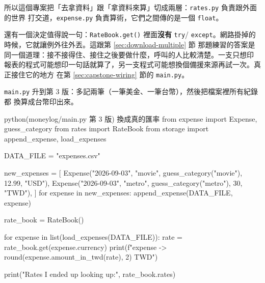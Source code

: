 所以這個專案把「去拿資料」跟「拿資料來算」切成兩層：\texttt{rates.py} 負責跟外面的世界
打交道，\texttt{expense.py} 負責算術，它們之間傳的是一個 \texttt{float}。


還有一個決定值得說一句：\texttt{RateBook.get()} 裡面\textbf{沒有} \texttt{try}/
\texttt{except}。網路掛掉的時候，它就讓例外往外丟。這跟第 \ref{sec:download-multiple} 節
那題練習的答案是同一個道理：接不接得住、接住之後要做什麼，呼叫的人比較清楚。一支只想印
報表的程式可能想印一句話就算了，另一支程式可能想換個備援來源再試一次。真正接住它的地方
在第 \ref{sec:capstone-wiring} 節的 \texttt{main.py}。

\texttt{main.py} 升到第 3 版：多記兩筆（一筆美金、一筆台幣），然後把檔案裡所有紀錄都
換算成台幣印出來。

\begin{example}{python}{(moneylog/main.py 第 3 版) 換成真的匯率}
from expense import Expense, guess_category
from rates import RateBook
from storage import append_expense, load_expenses

DATA_FILE = "expenses.csv"

new_expenses = [
    Expense("2026-09-03", "movie", guess_category("movie"), 12.99, "USD"),
    Expense("2026-09-03", "metro", guess_category("metro"), 30, "TWD"),
]
for expense in new_expenses:
    append_expense(DATA_FILE, expense)

rate_book = RateBook()

for expense in list(load_expenses(DATA_FILE)):
    rate = rate_book.get(expense.currency)
    print(f"{expense} -> {round(expense.amount_in_twd(rate), 2)} TWD")

print("Rates I ended up looking up:", rate_book.rates)
\end{example}


